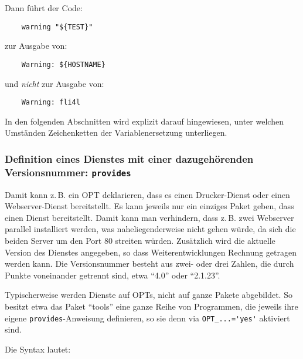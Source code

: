     Dann führt der Code:

\begin{example}
\begin{verbatim}
    warning "${TEST}"
\end{verbatim}
\end{example}

    zur Ausgabe von:
    
\begin{example}
\begin{verbatim}
    Warning: ${HOSTNAME}
\end{verbatim}
\end{example}

    und \emph{nicht} zur Ausgabe von:

\begin{example}
\begin{verbatim}
    Warning: fli4l
\end{verbatim}
\end{example}

    In den folgenden Abschnitten wird explizit darauf hingewiesen, unter
    welchen Umständen Zeichenketten der Variablenersetzung unterliegen.

\subsubsection{Definition eines Dienstes mit einer dazugehörenden
    Versionsnummer: \texttt{provides}}

    Damit kann z.\,B. ein OPT deklarieren, dass es einen Drucker-Dienst
    oder einen Webserver-Dienst
    bereitstellt. Es kann jeweils nur ein einziges Paket geben, dass
    einen Dienst bereitstellt. Damit kann man verhindern, dass
    z.\,B. zwei Webserver parallel installiert werden, was
    naheliegenderweise nicht gehen würde, da sich die beiden Server um
    den Port 80 streiten würden. Zusätzlich wird die aktuelle Version
    des Dienstes angegeben, so dass Weiterentwicklungen Rechnung getragen
    werden kann. Die Versionsnummer besteht aus zwei- oder drei Zahlen, die
    durch Punkte voneinander getrennt sind, etwa "`4.0"' oder "`2.1.23"'.

    Typischerweise werden Dienste auf OPTs, nicht auf ganze Pakete abgebildet.
    So besitzt etwa das Paket "`tools"' eine ganze Reihe von Programmen, die
    jeweils ihre eigene \texttt{provides}-Anweisung definieren, so sie denn
    via \verb+OPT_...='yes'+ aktiviert sind.

    Die Syntax lautet:

